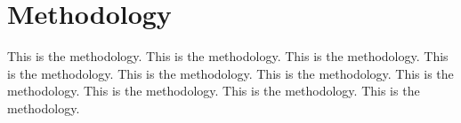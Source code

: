 \section{Methodology}
\label{sec:3}

This is the methodology. This is the methodology. This is the methodology. This is the methodology. This is the methodology. This is the methodology. This is the methodology. This is the methodology. This is the methodology. This is the methodology. 